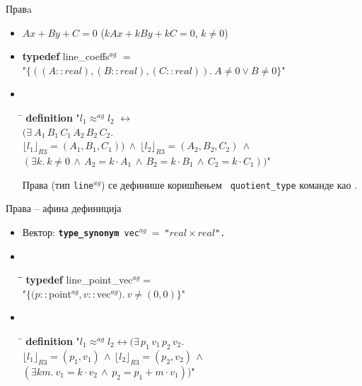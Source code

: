 \documentclass[slidestop, compress, mathserif, containsverbatim, xcolor=dvipsnames]{beamer}
\newcommand{\RepRt}[1]{\ensuremath{\lfloor#1\rfloor_{R3}}}
\begin{document}
\begin{frame}{Правa}
  \begin{itemize}
  \item $Ax + By + C = 0$ ($kAx + kBy + kC = 0$, $k \neq 0$) \vfill
  \item \begin{tabbing}
        {\bf typedef} line\_coeffs$^{ag}$ $=$ \\
        \hspace{5mm}"$\{((A::real), (B::real), (C::real)).\ A \neq 0 \vee B \neq 0\}$"
  \end{tabbing} \vfill
  \item {\tt
    \begin{tabbing}
      \hspace{5mm}\=\kill
      {\bf definition} "$l_1 \approx^{ag} l_2$ $\longleftrightarrow$ \\
      \>  $(\exists\ A_1\,B_1\,C_1\,A_2\,B_2\,C_2.$\\
      \>  $\RepRt{l_1} = (A_1, B_1, C_1)) \ \wedge\ \RepRt{l_2} = (A_2, B_2, C_2)\ \wedge$\\
      \>  $(\exists k.\ k \neq 0 \,\wedge\, A_2 = k\cdot A_1 \,\wedge\,  B_2 = k\cdot B_1\,\wedge\,C_2 = k\cdot C_1))$"
    \end{tabbing}
  }
    
  \begin{block}{}
    Права (тип {\tt line$^{ag}$}) се дефинише коришћењем {\tt
    quotient\_type} команде као .
  \end{block}
  \end{itemize}
\end{frame}

\begin{frame}{Права -- афина дефиниција}
  \begin{itemize}
    \item Вектор: {\tt {\bf type\_synonym}\ vec$^{ag}\ =\ $"$real   \times real$".} \vfill
    \item {\tt 
      \begin{tabbing}
          \hspace{5mm}\=\hspace{5mm}\=\kill
          {\bf typedef} line\_point\_vec$^{ag}=$\\
            \> "$\{(p::$point$^{ag}, v::$vec$^{ag}).\ v \neq (0, 0)\}$"
      \end{tabbing}
      } \vfill
    \item {\tt
      \begin{tabbing}
        \hspace{5mm}\=\kill
        {\bf definition} "$l_1 \approx^{ag} l_2 \longleftrightarrow (\exists\,p_1\,v_1\,p_2\,v_2.$\\
        \>$\RepRt{l_1} = (p_1, v_1) \,\wedge\,  \RepRt{l_2} = (p_2, v_2) \,\wedge$\\
        \>$(\exists k m.\ v_1 = k\cdot v_2 \,\wedge\, p_2 = p_1 + m\cdot v_1))$"
      \end{tabbing}
    }
  \end{itemize}
\end{frame}
\end{document}
